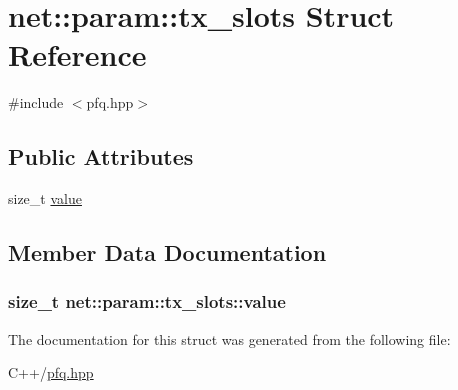 \hypertarget{structnet_1_1param_1_1tx__slots}{\section{net\-:\-:param\-:\-:tx\-\_\-slots Struct Reference}
\label{structnet_1_1param_1_1tx__slots}
}


{\ttfamily \#include $<$pfq.\-hpp$>$}

\subsection*{Public Attributes}
\begin{DoxyCompactItemize}
\item 
size\-\_\-t \hyperlink{structnet_1_1param_1_1tx__slots_aa9c38079016460b21e406579485f94a1}{value}
\end{DoxyCompactItemize}


\subsection{Member Data Documentation}
\hypertarget{structnet_1_1param_1_1tx__slots_aa9c38079016460b21e406579485f94a1}{
\subsubsection[{value}]{\setlength{\rightskip}{0pt plus 5cm}size\-\_\-t net\-::param\-::tx\-\_\-slots\-::value}}\label{structnet_1_1param_1_1tx__slots_aa9c38079016460b21e406579485f94a1}


The documentation for this struct was generated from the following file\-:\begin{DoxyCompactItemize}
\item 
C++/\hyperlink{pfq_8hpp}{pfq.\-hpp}\end{DoxyCompactItemize}
